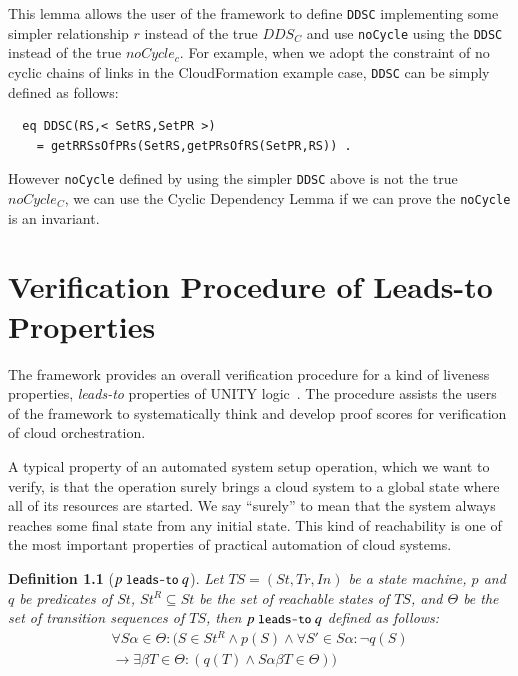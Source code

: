 \documentclass[12pt]{report}
\newtheorem{definition}{Definition}
\newcommand{\ra}{\rightarrow}
\newcommand{\mbstt}[1]{\mbox{\small{\tt {#1}}}}
\newcommand{\ul}{\underline}
\begin{document}
This lemma allows the user of the framework to define {\tt DDSC}
implementing some simpler relationship $r$ instead of the true $DDS_C$
and use {\tt noCycle} using the {\tt DDSC} instead of the true
$noCycle_c$. For example, when we adopt the constraint of no cyclic
chains of links in the CloudFormation example case, {\tt DDSC} can be
simply defined as follows:
\begin{verbatim}
  eq DDSC(RS,< SetRS,SetPR >)
    = getRRSsOfPRs(SetRS,getPRsOfRS(SetPR,RS)) .
\end{verbatim}
However {\tt noCycle} defined by using the simpler {\tt DDSC} above is
 not the true $noCycle_C$, we can use the Cyclic Dependency Lemma if
 we can prove the {\tt noCycle} is an invariant.

\chapter{Verification Procedure of Leads-to Properties}
\label{chap:verification}
The framework provides an overall verification procedure for a kind of
liveness properties, {\it leads-to} properties of UNITY
logic~\cite{DBLP:books/daglib/0067338}.  The procedure assists the
users of the framework to systematically think and develop proof
scores for verification of cloud orchestration.

A typical property of an automated system setup operation, which we
want to verify, is that the operation surely brings a cloud system to
a global state where all of its resources are started.  We say ``surely''
to mean that the system always reaches some final state from any
initial state. This kind of reachability is one of the most important
properties of practical automation of cloud systems.

\begin{definition}[$p~\mbstt{leads-to}~q$]
  Let $TS=(St,Tr,In)$ be a state machine, $p$ and $q$ be predicates of
  $St$, $St^R\subseteq St$ be the set of reachable states of $TS$, and
  $\Theta$ be the set of transition sequences of $TS$, then
  \ul{$p~\mbstt{leads-to}~q$} defined as follows:
  \begin{eqnarray*}
  \forall S\alpha\in \Theta: (S\in St^R \land p(S) \land
  \forall S'\in S\alpha: \neg q(S)\\
  \ra \exists \beta T\in \Theta:(q(T) \land S\alpha\beta T\in \Theta))
  \end{eqnarray*}
\end{definition}
\end{document}
